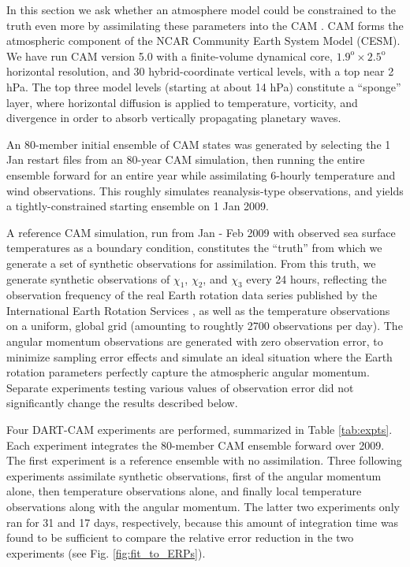 In this section we ask whether an atmosphere model could be constrained to the truth even more by assimilating these parameters 
into the CAM \citep{nealeetal2010}.
CAM forms the atmospheric component of the NCAR Community Earth System Model (CESM). 
We have run CAM version 5.0 with a finite-volume dynamical core, $1.9^{\text{o}} \times 2.5^{\text{o}}$ horizontal resolution, and  30 hybrid-coordinate vertical levels, with a top near 2 hPa.
The top three model levels (starting at about 14 hPa) constitute a ``sponge'' layer, where horizontal diffusion is applied to temperature, vorticity, and divergence in order to absorb vertically propagating planetary waves.  

An 80-member initial ensemble of CAM states was generated by selecting the 1 Jan restart files from an 80-year CAM simulation,
then running the entire ensemble forward for an entire year while 
assimilating 6-hourly temperature and wind observations. 
This roughly simulates reanalysis-type observations, and yields a tightly-constrained starting ensemble on 1 Jan 2009.  

A reference CAM simulation, run from Jan - Feb 2009 with observed sea surface temperatures as a boundary condition, constitutes the ``truth'' from which we generate a set of synthetic observations for assimilation. 
From this truth, we generate synthetic observations of $\chi_1$, $\chi_2$, and $\chi_3$ every 24 hours, reflecting the observation frequency of the real Earth rotation data series published by the International Earth Rotation Services \citep{iers}, as well as the temperature observations on a uniform, global grid (amounting to roughtly 2700 observations per day). 
The angular momentum observations are generated with zero observation error, to minimize sampling error effects and simulate an ideal situation where the Earth rotation parameters perfectly capture the atmospheric angular momentum. 
Separate experiments testing various values of observation error did not significantly change the results described below.  

Four DART-CAM experiments are performed, summarized in Table \ref{tab:expts}.
Each experiment 
integrates the  80-member CAM ensemble forward over 2009.
The first experiment is a reference ensemble with no assimilation. 
Three following experiments assimilate synthetic observations, first of the angular momentum alone, then temperature observations alone, and finally local temperature observations along with the angular momentum. 
The latter two experiments only ran for 31 and 17 days, respectively, because this amount of integration time was found to be sufficient to compare the relative error reduction in the two experiments (see Fig. \ref{fig:fit_to_ERPs}). 

